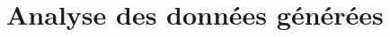 \documentclass[
	headsepline=on,
	footsepline=on,
	twoside=off,
	abstract=on,
	DIV=10
]{scrreprt}
\begin{document}
		
		
		
		
		
		
		
		
		
		
		
		
		
	\part{Analyse des données générées}
	
	
	
	
\end{document}
